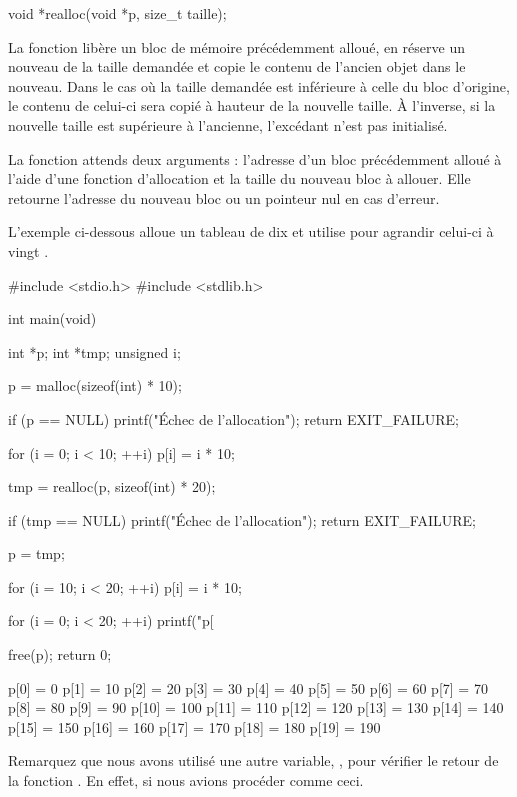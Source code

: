 \begin{C}
void *realloc(void *p, size_t taille);
\end{C}

La fonction  libère un bloc de mémoire précédemment
alloué, en réserve un nouveau de la taille demandée et copie le contenu
de l'ancien objet dans le nouveau. Dans le cas où la taille demandée est
inférieure à celle du bloc d'origine, le contenu de celui-ci sera copié
à hauteur de la nouvelle taille. À l'inverse, si la nouvelle taille est
supérieure à l'ancienne, l'excédant n'est pas initialisé.

La fonction attends deux arguments : l'adresse d'un bloc précédemment
alloué à l'aide d'une fonction d'allocation et la taille du nouveau bloc
à allouer. Elle retourne l'adresse du nouveau bloc ou un pointeur nul en
cas d'erreur.

L'exemple ci-dessous alloue un tableau de dix  et utilise
 pour agrandir celui-ci à vingt .

\begin{C}
#include <stdio.h>
#include <stdlib.h>


int main(void)
{
    int *p;
    int *tmp;
    unsigned i;

    p = malloc(sizeof(int) * 10);

    if (p == NULL)
    {
        printf("Échec de l'allocation\n");
        return EXIT_FAILURE;
    }

    for (i = 0; i < 10; ++i)
        p[i] = i * 10;

    tmp = realloc(p, sizeof(int) * 20);

    if (tmp == NULL)
    {
        printf("Échec de l'allocation\n");
        return EXIT_FAILURE;
    }

    p = tmp;

    for (i = 10; i < 20; ++i)
        p[i] = i * 10;

    for (i = 0; i < 20; ++i)
        printf("p[%

    free(p);
    return 0;
}
\end{C}

\begin{C}
p[0] = 0
p[1] = 10
p[2] = 20
p[3] = 30
p[4] = 40
p[5] = 50
p[6] = 60
p[7] = 70
p[8] = 80
p[9] = 90
p[10] = 100
p[11] = 110
p[12] = 120
p[13] = 130
p[14] = 140
p[15] = 150
p[16] = 160
p[17] = 170
p[18] = 180
p[19] = 190
\end{C}

Remarquez que nous avons utilisé une autre variable, , pour
vérifier le retour de la fonction . En effet, si nous
avions procéder comme ceci.

